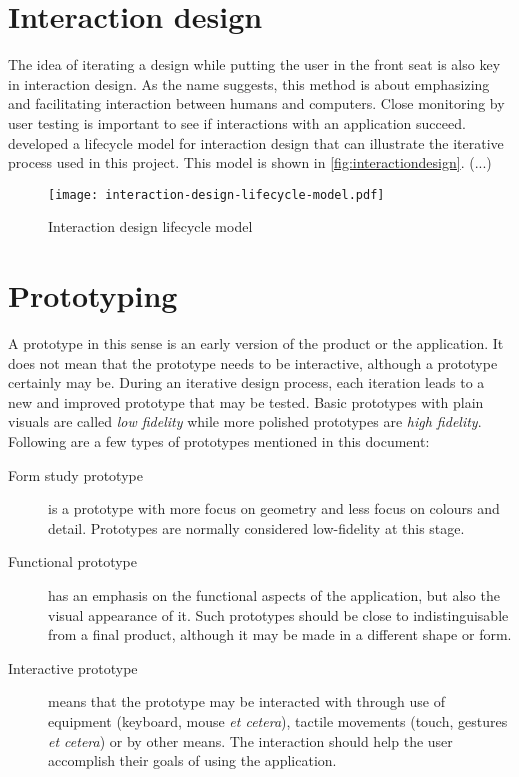

\section{Interaction design}
\label{sec:interactiondesign}

The idea of iterating a design while putting the user in the front seat is also key in interaction design. As the name suggests, this method is about emphasizing and facilitating interaction between humans and computers. Close monitoring by user testing is important to see if interactions with an application succeed. \textcite{preece2015} developed a lifecycle model for interaction design that can illustrate the iterative process used in this project. This model is shown in \autoref{fig:interactiondesign}. (...)


\begin{figure}
    \centering
    \texttt{[image: interaction-design-lifecycle-model.pdf]}
    \caption{Interaction design lifecycle model}
    \label{fig:interactiondesign}
\end{figure}

\section{Prototyping}
\label{sec:prototyping}

A prototype in this sense is an early version of the product or the application. It does not mean that the prototype needs to be interactive, although a prototype certainly may be. During an iterative design process, each iteration leads to a new and improved prototype that may be tested. Basic prototypes with plain visuals are called \emph{low fidelity} while more polished prototypes are \emph{high fidelity}. Following are a few types of prototypes mentioned in this document:

\begin{description}
    \item[Form study prototype] is a prototype with more focus on geometry and less focus on colours and detail. Prototypes are normally considered low-fidelity at this stage.
    \item[Functional prototype] has an emphasis on the functional aspects of the application, but also the visual appearance of it. Such prototypes should be close to indistinguisable from a final product, although it may be made in a different shape or form.
    \item[Interactive prototype] means that the prototype may be interacted with through use of equipment (keyboard, mouse \emph{et cetera}), tactile movements (touch, gestures \emph{et cetera}) or by other means. The interaction should help the user accomplish their goals of using the application.
\end{description}

